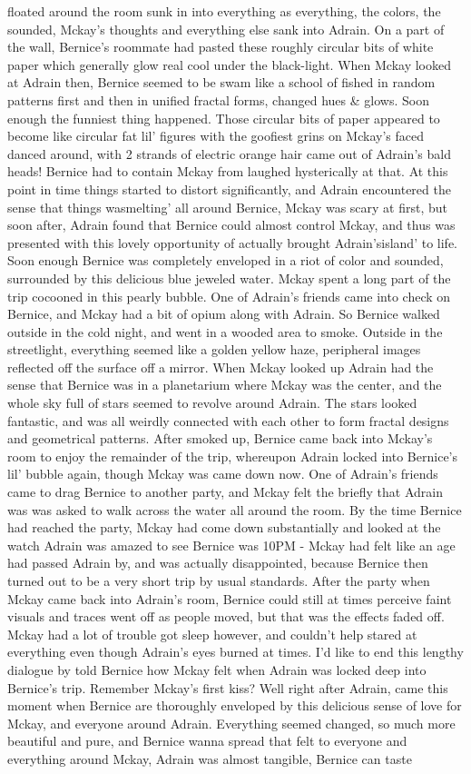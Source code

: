 \documentclass[12pt]{book}
\begin{document}
floated around the room sunk in into everything as everything, the colors, the sounded, Mckay's thoughts and everything else sank into Adrain. On a part of the wall, Bernice's roommate had pasted these roughly circular bits of white paper which generally glow real cool under the black-light. When Mckay looked at Adrain then, Bernice seemed to be swam like a school of fished in random patterns first and then in unified fractal forms, changed hues \& glows. Soon enough the funniest thing happened. Those circular bits of paper appeared to become like circular fat lil' figures with the goofiest grins on Mckay's faced danced around, with 2 strands of electric orange hair came out of Adrain's bald heads! Bernice had to contain Mckay from laughed hysterically at that. At this point in time things started to distort significantly, and Adrain encountered the sense that things wasmelting' all around Bernice, Mckay was scary at first, but soon after, Adrain found that Bernice could almost control Mckay, and thus was presented with this lovely opportunity of actually brought Adrain'sisland' to life. Soon enough Bernice was completely enveloped in a riot of color and sounded, surrounded by this delicious blue jeweled water. Mckay spent a long part of the trip cocooned in this pearly bubble. One of Adrain's friends came into check on Bernice, and Mckay had a bit of opium along with Adrain. So Bernice walked outside in the cold night, and went in a wooded area to smoke. Outside in the streetlight, everything seemed like a golden yellow haze, peripheral images reflected off the surface off a mirror. When Mckay looked up Adrain had the sense that Bernice was in a planetarium where Mckay was the center, and the whole sky full of stars seemed to revolve around Adrain. The stars looked fantastic, and was all weirdly connected with each other to form fractal designs and geometrical patterns. After smoked up, Bernice came back into Mckay's room to enjoy the remainder of the trip, whereupon Adrain locked into Bernice's lil' bubble again, though Mckay was came down now. One of Adrain's friends came to drag Bernice to another party, and Mckay felt the briefly that Adrain was was asked to walk across the water all around the room. By the time Bernice had reached the party, Mckay had come down substantially and looked at the watch Adrain was amazed to see Bernice was 10PM - Mckay had felt like an age had passed Adrain by, and was actually disappointed, because Bernice then turned out to be a very short trip by usual standards. After the party when Mckay came back into Adrain's room, Bernice could still at times perceive faint visuals and traces went off as people moved, but that was the effects faded off. Mckay had a lot of trouble got sleep however, and couldn't help stared at everything even though Adrain's eyes burned at times. I'd like to end this lengthy dialogue by told Bernice how Mckay felt when Adrain was locked deep into Bernice's trip. Remember Mckay's first kiss? Well right after Adrain, came this moment when Bernice are thoroughly enveloped by this delicious sense of love for Mckay, and everyone around Adrain. Everything seemed changed, so much more beautiful and pure, and Bernice wanna spread that felt to everyone and everything around Mckay, Adrain was almost tangible, Bernice can taste 
\end{document}
